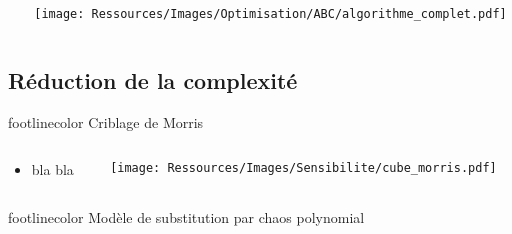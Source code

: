 \documentclass[xcolor=x11names, compress, 11pt]{beamer}
\makeatletter
\DeclarePairedDelimiter\abs{\lvert}{\rvert}
\let\oldabs\abs
\def\abs{\@ifstar{\oldabs}{\oldabs*}}
\newcommand{\addsubtitle}[1]{%
\begin{beamercolorbox}[sep=2pt,center,shadow=true,rounded=true]{footlinecolor}
    #1\par%
\end{beamercolorbox}%
}
\makeatother
\begin{document}
\begin{frame}[c]
    \vfill
    \centering
    \begin{columns}
        \begin{column}{0.45\textwidth}
            \centering
        \end{column}%
        \begin{column}{0.55\textwidth}
            \raggedleft
            \texttt{[image: Ressources/Images/Optimisation/ABC/algorithme\_complet.pdf]}
        \end{column}%
    \end{columns}%
    \vfill
\end{frame}




\subsection{Réduction de la complexité}
\begin{frame}[t]
    \addsubtitle{Criblage de Morris}
    \vfill
    \centering
    \begin{columns}
        \begin{column}{0.5\textwidth}
            \centering
            \begin{itemize}
                \item bla bla
            \end{itemize}
        \end{column}%
        \begin{column}{0.6\textwidth}
            \raggedleft
            \texttt{[image: Ressources/Images/Sensibilite/cube\_morris.pdf]}
        \end{column}%
    \end{columns}%
    \vfill
\end{frame}


\begin{frame}[t]
    \addsubtitle{Modèle de substitution par chaos polynomial}
    \vfill
    \centering
    \vfill
\end{frame}
\end{document}
